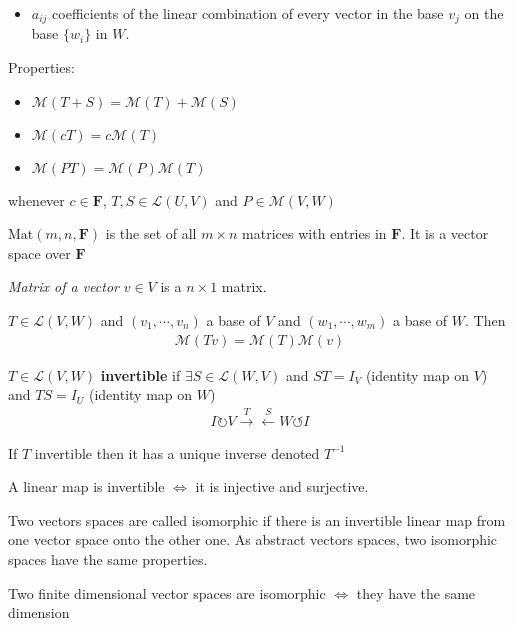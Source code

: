 \documentclass[11pt,notitlepage,oneside]{article}
\begin{document}
\begin{description}
\begin{itemize}
  \item $a_{ij}$ coefficients of the linear combination of every vector in the base $v_j$ on the base $\{w_i\}$ in $W$.
  \end{itemize}
  Properties:
  \begin{itemize}
  \item $\mathcal{M}(T+S) = \mathcal{M}(T) + \mathcal{M}(S)$
  \item $\mathcal{M}(cT) = c\mathcal{M}(T)$
  \item $\mathcal{M}(PT) = \mathcal{M}(P)\mathcal{M}(T)$
  \end{itemize}
  whenever $c\in\mathbf{F}$, $T,S\in\mathcal{L}(U,V)$ and  $P\in\mathcal{M}(V,W)$
  \item $\mathrm{Mat}(m,n,\mathbf{F})$ is the set of all $m\times n$ matrices with entries in $\mathbf{F}$. It is a vector space over $\mathbf{F}$
  \item \emph{Matrix of a vector} $v\in V$ is a $n\times 1$ matrix.
  \item[P14] $T\in\mathcal{L}(V,W)$ and $(v_1,\cdots,v_n)$ a base of $V$ and $(w_1,\cdots,w_m)$ a base of $W$. Then
  \begin{align*}
  \mathcal{M}(Tv) =\mathcal{M}(T)\mathcal{M}(v) 
  \end{align*}
  \item[Invertibility\label{itm:D3_invertible_operator}] $T\in\mathcal{L}(V,W)$ \textbf{invertible} if $\exists S\in\mathcal{L}(W,V)$ and $ST=I_V$ (identity map on $V$) and $TS=I_U$ (identity map on $W$) 
  \begin{align*}
  I \circlearrowright V \xrightarrow{T}\xleftarrow{S} W \circlearrowleft I
  \end{align*}
  \item If $T$ invertible then it has a unique inverse denoted $T^{-1}$ 
  \item[P17] A linear map is invertible $\iff$ it is injective and surjective.
  
  \item[Isomorphic] Two vectors spaces are called isomorphic if there is an invertible linear map from one vector space onto the other one. As abstract vectors spaces, two isomorphic spaces have the same properties.
  
  \item[T18] Two finite dimensional vector spaces are isomorphic $\iff$ they have the same dimension
  
  \item[P19]
  

\end{description}
\end{document}
